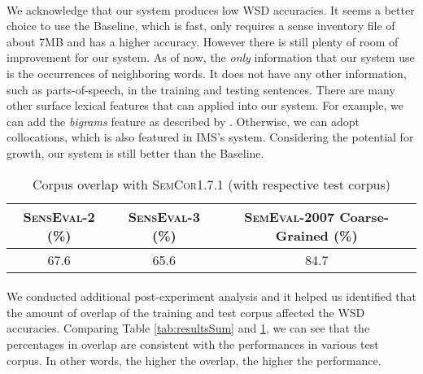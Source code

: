 \paragraph{}
We acknowledge that our system produces low WSD accuracies. It seems a better choice to use the Baseline, which is fast, only requires a sense inventory file of about 7MB and has a higher accuracy. However there is still plenty of room of improvement for our system. As of now, the \textit{only} information that our system use is the occurrences of neighboring words. It does not have any other information, such as parts-of-speech, in the training and testing sentences. There are many other surface lexical features that can applied into our system. For example, we can add the \textit{bigrams} feature as described by \cite{pederson}. Otherwise, we can adopt collocations, which is also featured in IMS's system. Considering the potential for growth, our system is still better than the Baseline.

\begin{table}[h]
	\center
	\begin{tabular}{| c | c | c |}
		\hline
		\textsc{SensEval-2} (\%) & \textsc{SensEval-3} (\%) & \textsc{SemEval-2007} Coarse-Grained (\%) \\
		\hline
		67.6 & 65.6 & 84.7 \\
		\hline
	\end{tabular}
	\caption{Corpus overlap with \textsc{SemCor1.7.1} (with respective test corpus)}
	\label{tab:overlapPercentage}
\end{table}

\paragraph{}
We conducted additional post-experiment analysis and it helped us identified that the amount of overlap of the training and test corpus affected the WSD accuracies. Comparing Table \ref{tab:resultsSum} and \ref{tab:overlapPercentage}, we can see that the percentages in overlap are consistent with the performances in various test corpus. In other words, the higher the overlap, the higher the performance.

